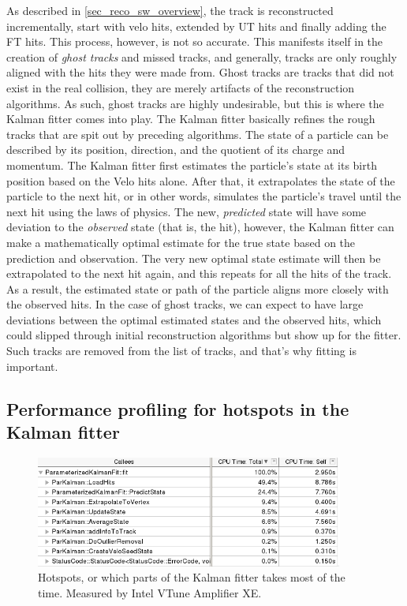 \documentclass[12pt]{article}
\begin{document}
As described in \ref{sec_reco_sw_overview}, the track is reconstructed incrementally, start with velo hits, extended by UT hits and finally adding the FT hits. This process, however, is not so accurate. This manifests itself in the creation of \textit{ghost tracks} and missed tracks, and generally, tracks are only roughly aligned with the hits they were made from. Ghost tracks are tracks that did not exist in the real collision, they are merely artifacts of the reconstruction algorithms. As such, ghost tracks are highly undesirable, but this is where the Kalman fitter comes into play. 
The Kalman fitter basically refines the rough tracks that are spit out by preceding algorithms. The state of a particle can be described by its position, direction, and the quotient of its charge and momentum. The Kalman fitter first estimates the particle's state at its birth position based on the Velo hits alone. After that, it extrapolates the state of the particle to the next hit, or in other words, simulates the particle's travel until the next hit using the laws of physics. The new, \textit{predicted} state will have some deviation to the \textit{observed} state (that is, the hit), however, the Kalman fitter can make a mathematically optimal estimate for the true state based on the prediction and observation. The very new optimal state estimate will then be extrapolated to the next hit again, and this repeats for all the hits of the track.
As a result, the estimated state or path of the particle aligns more closely with the observed hits. In the case of ghost tracks, we can expect to have large deviations between the optimal estimated states and the observed hits, which could slipped through initial reconstruction algorithms but show up for the fitter. Such tracks are removed from the list of tracks, and that's why fitting is important.


\subsection{Performance profiling for hotspots in the Kalman fitter}

\begin{figure}[H]
	\begin{center}
		\includegraphics[width=0.9\textwidth]{kalmanfit_overall_breakdown}
	\end{center}
	\caption{Hotspots, or which parts of the Kalman fitter takes most of the time. Measured by Intel VTune Amplifier XE.}
	\label{fig_kalman_vtune_initial}
\end{figure}
\end{document}
